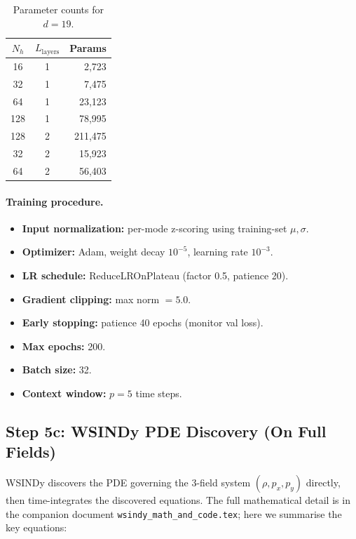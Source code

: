 \documentclass[11pt]{article}
\begin{document}
\begin{table}[H]
\centering
\caption{Parameter counts for $d = 19$.}
\label{tab:params}
\small
\begin{tabular}{@{}ccr@{}}
\toprule
$N_h$ & $L_{\text{layers}}$ & Params \\
\midrule
16  & 1 & 2,723 \\
32  & 1 & 7,475 \\
64  & 1 & 23,123 \\
128 & 1 & 78,995 \\
128 & 2 & 211,475 \\
32  & 2 & 15,923 \\
64  & 2 & 56,403 \\
\bottomrule
\end{tabular}
\end{table}


\paragraph{Training procedure.}
\begin{itemize}[nosep]
  \item \textbf{Input normalization:} per-mode z-scoring using training-set $\mu, \sigma$.
  \item \textbf{Optimizer:} Adam, weight decay $10^{-5}$, learning rate $10^{-3}$.
  \item \textbf{LR schedule:} ReduceLROnPlateau (factor 0.5, patience 20).
  \item \textbf{Gradient clipping:} max norm $= 5.0$.
  \item \textbf{Early stopping:} patience 40 epochs (monitor val loss).
  \item \textbf{Max epochs:} 200.
  \item \textbf{Batch size:} 32.
  \item \textbf{Context window:} $p = 5$ time steps.
\end{itemize}


\subsection{Step 5c: WSINDy PDE Discovery (On Full Fields)}
\label{sec:wsindy_exp}

WSINDy discovers the PDE governing the 3-field system
$(\rho, p_x, p_y)$ directly, then time-integrates the discovered
equations.  The full mathematical detail is in the companion document
\texttt{wsindy\_math\_and\_code.tex}; here we summarise the key
equations:
\end{document}
